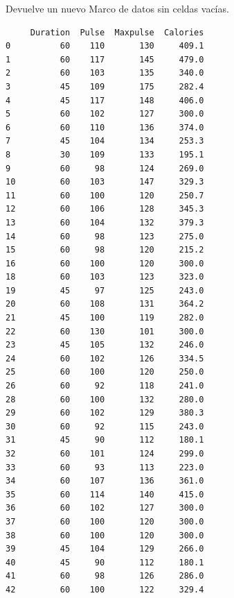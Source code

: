 \begin{code} Devuelve un nuevo Marco de datos sin celdas vacías.

\begin{Shaded}
\begin{Highlighting}[]

\OperatorTok{=}\NormalTok{)}

\OperatorTok{=}

\end{Highlighting}
\end{Shaded}

\begin{verbatim}
     Duration  Pulse  Maxpulse  Calories
0          60    110       130     409.1
1          60    117       145     479.0
2          60    103       135     340.0
3          45    109       175     282.4
4          45    117       148     406.0
5          60    102       127     300.0
6          60    110       136     374.0
7          45    104       134     253.3
8          30    109       133     195.1
9          60     98       124     269.0
10         60    103       147     329.3
11         60    100       120     250.7
12         60    106       128     345.3
13         60    104       132     379.3
14         60     98       123     275.0
15         60     98       120     215.2
16         60    100       120     300.0
18         60    103       123     323.0
19         45     97       125     243.0
20         60    108       131     364.2
21         45    100       119     282.0
22         60    130       101     300.0
23         45    105       132     246.0
24         60    102       126     334.5
25         60    100       120     250.0
26         60     92       118     241.0
28         60    100       132     280.0
29         60    102       129     380.3
30         60     92       115     243.0
31         45     90       112     180.1
32         60    101       124     299.0
33         60     93       113     223.0
34         60    107       136     361.0
35         60    114       140     415.0
36         60    102       127     300.0
37         60    100       120     300.0
38         60    100       120     300.0
39         45    104       129     266.0
40         45     90       112     180.1
41         60     98       126     286.0
42         60    100       122     329.4

\end{verbatim}
\end{code}
